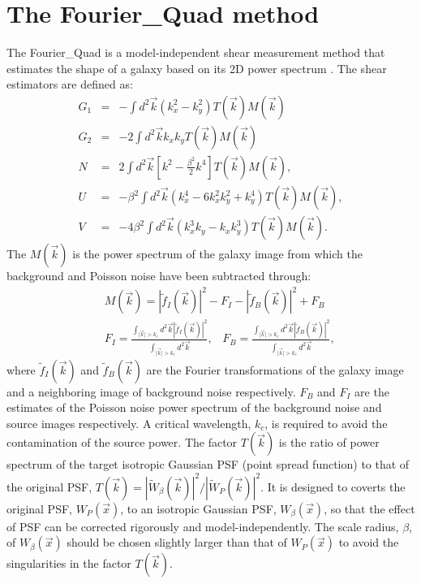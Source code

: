 \documentclass[twocolumn]{aastex62}
\begin{document}
 



\section{The Fourier\_Quad method}\label{sec:FQ}
The Fourier\_Quad is a model-independent shear measurement method that estimates the shape of a galaxy based on its 2D power spectrum \citep{Zhang2008, Zhang2015, Zhang2017}. The shear estimators are defined as:
\begin{eqnarray}
\label{shear_estimator}
G_1&=&-\int d^2\vec{k}(k_x^2-k_y^2)T(\vec{k})M(\vec{k})\\ \nonumber
G_2&=&-2\int d^2\vec{k}k_xk_yT(\vec{k})M(\vec{k})\\ \nonumber
N&=&2\int d^2\vec{k}\left[k^2-\frac{\beta^2}{2}k^4\right]T(\vec{k})M(\vec{k}), \\ \nonumber
U &=& -\beta^2\int d^2\vec{k}(k_x^4 - 6k_x^2k_y^2 + k_y^4)T(\vec{k})M(\vec{k}), \\ \nonumber
V &=& -4\beta^2\int d^2\vec{k}(k_x^3k_y - k_xk_y^3)T(\vec{k})M(\vec{k}).
\end{eqnarray}
The $M(\vec{k})$ is the power spectrum of the galaxy image from which the background and Poisson noise have been subtracted through:
\begin{eqnarray}
\label{FQ_TM}
&&M(\vec{k})=\left\vert\widetilde{f}_I(\vec{k})\right\vert^2-F_I-\left\vert\widetilde{f}_B(\vec{k})\right\vert^2+F_B\\ \nonumber
&&F_I=\frac{\int_{\vert\vec{k}\vert > k_c} d^2\vec{k}\left\vert\widetilde{f}_I(\vec{k})\right\vert^2}{\int_{\vert\vec{k}\vert > k_c} d^2\vec{k}}, \;\;\; F_B=\frac{\int_{\vert\vec{k}\vert > k_c} d^2\vec{k}\left\vert\widetilde{f}_B(\vec{k})\right\vert^2}{\int_{\vert\vec{k}\vert > k_c} d^2\vec{k}},
\end{eqnarray}
where $\widetilde{f}_I(\vec{k})$ and $\widetilde{f}_B(\vec{k})$ are the Fourier transformations of the galaxy image and a neighboring image of background noise respectively. $F_B$ and $F_I$ are the estimates of the Poisson noise power spectrum of the background noise and source images respectively. A critical wavelength, $k_c$, is required to avoid the contamination of the source power\citep{Zhang2015}. The factor $T(\vec{k})$ is the ratio of power spectrum of the target isotropic Gaussian PSF (point spread function) to that of the original PSF, $T(\vec{k}) = |\widetilde{W}_{\beta}(\vec{k})|^2/|\widetilde{W}_{P}(\vec{k})|^2$.
It is designed to coverts the original PSF, $W_{P}(\vec{x})$, to an isotropic Gaussian PSF, $W_{\beta}(\vec{x})$, so that the effect of PSF can be corrected rigorously and model-independently.
The scale radius, $\beta$, of $W_{\beta}(\vec{x})$ should be chosen slightly larger than that of $W_{P}(\vec{x})$ to avoid the singularities in the factor $T(\vec{k})$. 
\end{document}
